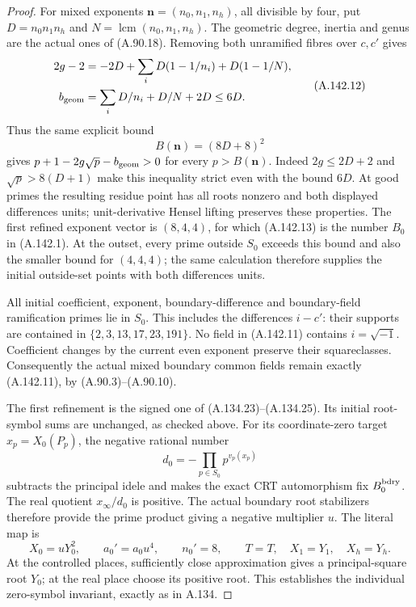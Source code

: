 \begin{proof}
For mixed exponents \(\boldsymbol n=(n_0,n_1,n_h)\), all divisible
by four, put \(D=n_0n_1n_h\) and
\(N=\operatorname{lcm}(n_0,n_1,n_h)\).
The geometric degree, inertia and genus are the actual ones of
(A.90.18).  Removing both unramified fibres over \(c,c'\) gives
\[
 \begin{aligned}
 2g-2&=-2D+\sum_i D(1-1/n_i)+D(1-1/N),\\
 b_{\rm geom}&=\sum_i D/n_i+D/N+2D\le6D.
 \end{aligned}
\tag{A.142.12}
\]
Thus the same explicit bound
\[
                         B(\boldsymbol n)=(8D+8)^2
\tag{A.142.13}
\]
gives \(p+1-2g\sqrt p-b_{\rm geom}>0\) for every
\(p>B(\boldsymbol n)\).  Indeed \(2g\le2D+2\) and
\(\sqrt p>8(D+1)\) make this inequality strict even with
the bound \(6D\).  At good primes the resulting residue point
has all roots nonzero and both displayed differences units;
unit-derivative Hensel lifting preserves these properties.
The first refined exponent vector is \((8,4,4)\), for which
(A.142.13) is the number \(B_0\) in (A.142.1).
At the outset, every prime outside \(S_0\) exceeds this bound
and also the smaller bound for \((4,4,4)\); the same calculation
therefore supplies the initial outside-set points with both
differences units.

All initial coefficient, exponent, boundary-difference and
boundary-field ramification primes lie in \(S_0\).
This includes the differences \(i-c'\): their supports are
contained in \(\{2,3,13,17,23,191\}\).
No field in (A.142.11) contains \(i=\sqrt{-1}\).
Coefficient changes by the current even exponent preserve their
squareclasses.  Consequently the actual mixed boundary common
fields remain exactly (A.142.11), by (A.90.3)--(A.90.10).

The first refinement is the signed one of (A.134.23)--(A.134.25).
Its initial root-symbol sums are unchanged, as checked above.
For its coordinate-zero target \(x_p=X_0(P_p)\), the negative
rational number
\[
             d_0=-\prod_{p\in S_0}p^{v_p(x_p)}
\tag{A.142.14}
\]
subtracts the principal idele and makes the exact CRT automorphism
fix \(B_0^{\rm bdry}\).  The real quotient \(x_\infty/d_0\)
is positive.  The actual boundary root stabilizers therefore
provide the prime product giving a negative multiplier \(u\).
The literal map is
\[
             X_0=uY_0^2,\qquad a_0'=a_0u^4,\qquad n_0'=8,
                    \qquad T=T,\quad X_1=Y_1,\quad X_h=Y_h.
\tag{A.142.15}
\]
At the controlled places, sufficiently close approximation gives
a principal-square root \(Y_0\); at the real place choose its
positive root.  This establishes the individual zero-symbol
invariant, exactly as in A.134.


\end{proof}
